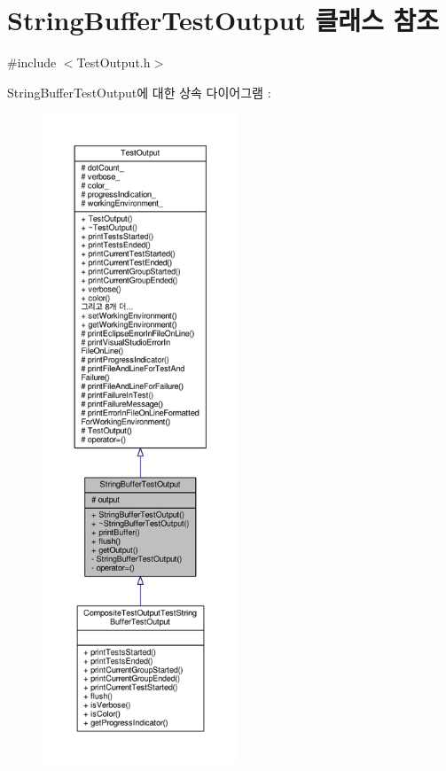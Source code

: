 \hypertarget{class_string_buffer_test_output}{}\section{String\+Buffer\+Test\+Output 클래스 참조}
\label{class_string_buffer_test_output}


{\ttfamily \#include $<$Test\+Output.\+h$>$}



String\+Buffer\+Test\+Output에 대한 상속 다이어그램 \+: 
\nopagebreak
\begin{figure}[H]
\begin{center}
\leavevmode
\includegraphics[height=550pt]{class_string_buffer_test_output__inherit__graph}
\end{center}
\end{figure}


